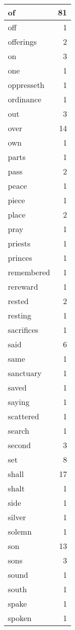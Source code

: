 \begin{center}
\begin{longtable}{l|r}
of & 81 \\ \hline
off & 1 \\ \hline
offerings & 2 \\ \hline
on & 3 \\ \hline
one & 1 \\ \hline
oppresseth & 1 \\ \hline
ordinance & 1 \\ \hline
out & 3 \\ \hline
over & 14 \\ \hline
own & 1 \\ \hline
parts & 1 \\ \hline
pass & 2 \\ \hline
peace & 1 \\ \hline
piece & 1 \\ \hline
place & 2 \\ \hline
pray & 1 \\ \hline
priests & 1 \\ \hline
princes & 1 \\ \hline
remembered & 1 \\ \hline
rereward & 1 \\ \hline
rested & 2 \\ \hline
resting & 1 \\ \hline
sacrifices & 1 \\ \hline
said & 6 \\ \hline
same & 1 \\ \hline
sanctuary & 1 \\ \hline
saved & 1 \\ \hline
saying & 1 \\ \hline
scattered & 1 \\ \hline
search & 1 \\ \hline
second & 3 \\ \hline
set & 8 \\ \hline
shall & 17 \\ \hline
shalt & 1 \\ \hline
side & 1 \\ \hline
silver & 1 \\ \hline
solemn & 1 \\ \hline
son & 13 \\ \hline
sons & 3 \\ \hline
sound & 1 \\ \hline
south & 1 \\ \hline
spake & 1 \\ \hline
spoken & 1 \\ \hline

\end{longtable}
\end{center}
